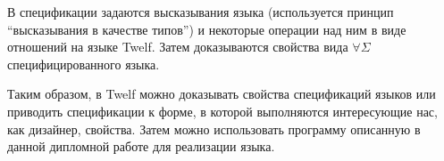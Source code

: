 В спецификации задаются высказывания языка (используется принцип ``высказывания в качестве типов''\cite{harper:1993}) и некоторые операции над ним в виде отношений на языке Twelf. Затем доказываются свойства вида  $\forall\Sigma$ специфицированного языка.

Таким образом, в Twelf можно доказывать свойства спецификаций языков или приводить спецификации к форме, в которой выполняются интересующие нас, как дизайнер, свойства. Затем можно использовать программу описанную в данной дипломной работе для реализации языка.






